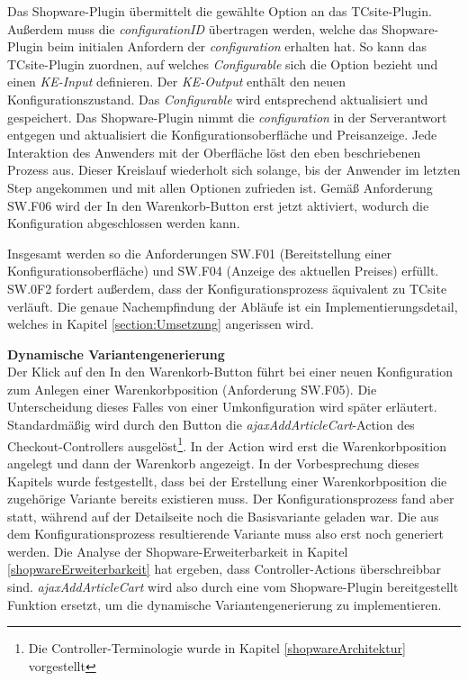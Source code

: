 \documentclass[11pt, a4paper, titlepage, listof=totoc, bibliography=totoc, index=totoc, twoside, openright, headings=normal, draft]{scrreprt}
\begin{document}
Das Shopware-Plugin übermittelt die gewählte Option an das TCsite-Plugin. Außerdem muss die \emph{configurationID} übertragen werden, welche das Shopware-Plugin beim initialen Anfordern der \emph{configuration} erhalten hat. So kann das TCsite-Plugin zuordnen, auf welches \emph{Configurable} sich die Option bezieht und einen \emph{KE-Input} definieren. Der \emph{KE-Output} enthält den neuen Konfigurationszustand. Das \emph{Configurable} wird entsprechend aktualisiert und gespeichert. Das Shopware-Plugin nimmt die \emph{configuration} in der Serverantwort entgegen und aktualisiert die Konfigurationsoberfläche und Preisanzeige. Jede Interaktion des Anwenders mit der Oberfläche löst den eben beschriebenen Prozess aus. Dieser Kreislauf wiederholt sich solange, bis der Anwender im letzten Step angekommen und mit allen Optionen zufrieden ist. Gemäß Anforderung SW.F06 wird der \glqq In den Warenkorb\grqq{}-Button erst jetzt aktiviert, wodurch die Konfiguration abgeschlossen werden kann.

Insgesamt werden so die Anforderungen SW.F01 (Bereitstellung einer Konfigurationsoberfläche) und SW.F04 (Anzeige des aktuellen Preises) erfüllt. SW.0F2 fordert außerdem, dass der Konfigurationsprozess äquivalent zu TCsite verläuft. Die genaue Nachempfindung der Abläufe ist ein Implementierungsdetail, welches in Kapitel \ref{section:Umsetzung} angerissen wird.

\textbf{Dynamische Variantengenerierung}\\
Der Klick auf den \glqq In den Warenkorb\grqq{}-Button führt bei einer neuen Konfiguration zum Anlegen einer Warenkorbposition (Anforderung SW.F05). Die Unterscheidung dieses Falles von einer Umkonfiguration wird später erläutert.  Standardmäßig wird durch den Button die \emph{ajaxAddArticleCart}-Action des Checkout-Controllers ausgelöst\footnote{Die Controller-Terminologie wurde in Kapitel \ref{shopwareArchitektur} vorgestellt}. In der Action wird erst die Warenkorbposition angelegt und dann der Warenkorb angezeigt. In der Vorbesprechung dieses Kapitels wurde festgestellt, dass bei der Erstellung einer Warenkorbposition die zugehörige Variante bereits existieren muss. Der Konfigurationsprozess fand aber statt, während auf der Detailseite noch die Basisvariante geladen war. Die aus dem Konfigurationsprozess resultierende Variante muss also erst noch generiert werden. Die Analyse der Shopware-Erweiterbarkeit in Kapitel \ref{shopwareErweiterbarkeit} hat ergeben, dass Controller-Actions überschreibbar sind. \emph{ajaxAddArticleCart} wird also durch eine vom Shopware-Plugin bereitgestellt Funktion ersetzt, um die dynamische Variantengenerierung zu implementieren.
\end{document}
